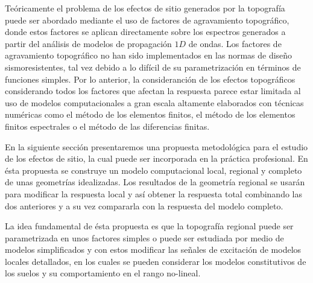 \documentclass[spanish,letterpaper,12pt,twoside,openany]{article}
\begin{document}
Teóricamente el problema de los efectos de sitio generados por la topografía puede ser abordado mediante el uso de factores de agravamiento topográfico, donde estos factores se aplican directamente sobre los espectros generados a partir del análisis de modelos de propagación $1D$ de ondas. Los factores de agravamiento topográfico no han sido implementados en las normas de diseño sismoresistentes, tal vez debido a lo difícil de su parametrización en términos de funciones simples. Por lo anterior, la consideranción de los efectos topográficos considerando todos los factores que afectan la respuesta parece estar limitada al uso de modelos computacionales a gran escala altamente elaborados con técnicas numéricas como el método de los elementos finitos, el método de los elementos finitos espectrales o el método de las diferencias finitas.

En la siguiente sección presentaremos una propuesta metodológica para el estudio de los efectos de sitio, la cual puede ser incorporada en la práctica profesional. En ésta propuesta se construye un modelo computacional local, regional y completo de unas geometrías idealizadas. Los resultados de la geometría regional se usarán para modificar la respuesta local y así obtener la respuesta total combinando las dos anteriores y a su vez compararla con la respuesta del modelo completo.

La idea fundamental de ésta propuesta es que la topografía regional puede ser parametrizada en unos factores simples o puede ser estudiada por medio de modelos simplificados y con estos modificar las señales de excitación de modelos locales detallados, en los cuales se pueden considerar los modelos constitutivos de los suelos y su comportamiento en el rango no-lineal.
%
%
%
%
%
\end{document}
